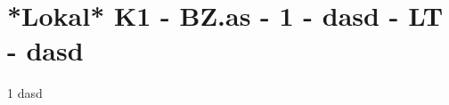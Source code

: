 \section{*Lokal* K1 - BZ.as - 1 - dasd - LT - dasd}

\begin{langesbeispiel} \item[1] %
dasd
\end{langesbeispiel}